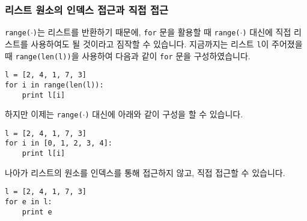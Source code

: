 \documentclass[../main.tex]{subfiles}
\begin{document}
\subsubsection{리스트 원소의 인덱스 접근과 직접 접근}
\texttt{range($\cdot$)}는 리스트를 반환하기 때문에, \texttt{for} 문을 활용할 때 \texttt{range($\cdot$)} 대신에 직접 리스트를 사용하여도 될 것이라고 짐작할 수 있습니다.
지금까지는 리스트 \texttt{l}이 주어졌을 때 \texttt{range(len(l))}을 사용하여 다음과 같이 \texttt{for} 문을 구성하였습니다.
\begin{verbatim}
l = [2, 4, 1, 7, 3]
for i in range(len(l)):
	print l[i]
\end{verbatim}
하지만 이제는 \texttt{range($\cdot$)} 대신에 아래와 같이 구성을 할 수 있습니다.
\begin{verbatim}
l = [2, 4, 1, 7, 3]
for i in [0, 1, 2, 3, 4]:
	print l[i]
\end{verbatim}
나아가 리스트의 원소를 인덱스를 통해 접근하지 않고, 직접 접근할 수 있습니다.
\begin{verbatim}
l = [2, 4, 1, 7, 3]
for e in l:
	print e
\end{verbatim}
\end{document}
